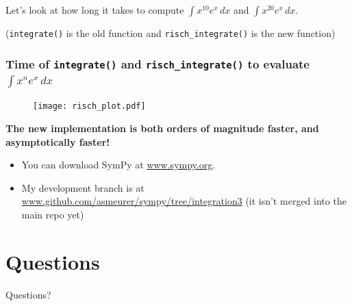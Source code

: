 \documentclass{beamer}
\numberwithin{equation}{section} %
\newcommand{\rischintegrate}{\texttt{risch\_integrate()}}
\begin{document}
\begin{frame}
    Let's look at how long it takes to compute $\int{x^{10}e^x\,dx}$ and $\int{x^{20}e^x\,dx}$.
    \begin{figure}
    \begin{flushleft}
    \end{flushleft}
    \end{figure}
    (\texttt{integrate()} is the old function and \rischintegrate{} is
    the new function)
\end{frame}

\begin{frame}
    \frametitle{Time of \texttt{integrate()} and \rischintegrate{} to evaluate $\int x^ne^x\,dx$}
    \begin{figure}
    \texttt{[image: risch\_plot.pdf]}
    \end{figure}
    {\bf The new implementation is both orders of magnitude faster, and
    asymptotically faster!}
\end{frame}

\begin{frame}
    \begin{itemize}
        \item You can download SymPy at \url{www.sympy.org}.
        \item My development branch is at
        \url{www.github.com/asmeurer/sympy/tree/integration3} (it
        isn't merged into the main repo yet)
    \end{itemize}
\end{frame}

\section{Questions}

\begin{frame}
    \huge{Questions?}
\end{frame}
\end{document}
